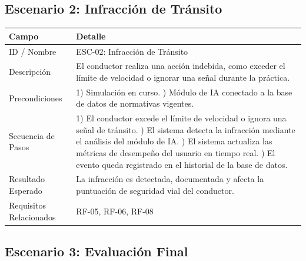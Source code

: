 \documentclass[12pt]{article}
\begin{document}
	\subsection{Escenario 2: Infracción de Tránsito}
	
	\begin{longtable}{|p{4cm}|p{10cm}|}
		\hline
		\textbf{Campo} & \textbf{Detalle} \\ \hline
		
		ID / Nombre & ESC-02: Infracción de Tránsito \\ \hline
		
		Descripción &
		El conductor realiza una acción indebida, como exceder el límite de velocidad o ignorar una señal durante la práctica. \\ \hline
		
		Precondiciones &
		1) Simulación en curso. \newline
		2) Módulo de IA conectado a la base de datos de normativas vigentes. \\ \hline
		
		Secuencia de Pasos &
		1) El conductor excede el límite de velocidad o ignora una señal de tránsito. \newline
		2) El sistema detecta la infracción mediante el análisis del módulo de IA. \newline
		3) El sistema actualiza las métricas de desempeño del usuario en tiempo real. \newline
		4) El evento queda registrado en el historial de la base de datos. \\ \hline
		
		Resultado Esperado &
		La infracción es detectada, documentada y afecta la puntuación de seguridad vial del conductor. \\ \hline
		
		Requisitos Relacionados &
		RF-05, RF-06, RF-08 \\ \hline
		
	\end{longtable}
	
	\subsection{Escenario 3: Evaluación Final}
	
\end{document}
